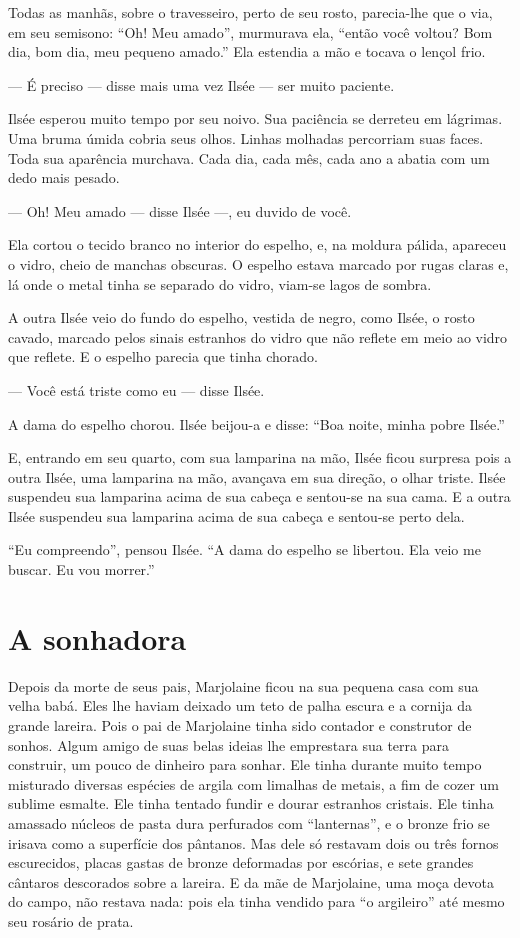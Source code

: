 Todas as manhãs, sobre o travesseiro, perto de seu rosto, parecia-lhe
que o via, em seu semisono: “Oh! Meu amado'', murmurava ela, ``então você
voltou? Bom dia, bom dia, meu pequeno amado.” Ela estendia a mão e tocava
o lençol frio.

--- É preciso --- disse mais uma vez Ilsée --- ser muito paciente.

Ilsée esperou muito tempo por seu noivo. Sua paciência se derreteu em
lágrimas. Uma bruma úmida cobria seus olhos. Linhas molhadas percorriam
suas faces. Toda sua aparência murchava. Cada dia, cada mês, cada ano a
abatia com um dedo mais pesado.

--- Oh! Meu amado --- disse Ilsée ---, eu duvido de você.

Ela cortou o tecido branco no interior do espelho, e, na moldura
pálida, apareceu o vidro, cheio de manchas obscuras. O espelho estava
marcado por rugas claras e, lá onde o metal tinha se separado do vidro,
viam-se lagos de sombra.

A outra Ilsée veio do fundo do espelho, vestida de negro, como Ilsée, o
rosto cavado, marcado pelos sinais estranhos do vidro que não reflete em meio
ao vidro que reflete. E o espelho parecia que tinha chorado.

--- Você está triste como eu --- disse Ilsée.

A dama do espelho chorou. Ilsée beijou-a e disse: “Boa noite, minha pobre
Ilsée.”

E, entrando em seu quarto, com sua lamparina na mão, Ilsée ficou
surpresa pois a outra Ilsée, uma lamparina na mão, avançava em sua
direção, o olhar triste. Ilsée suspendeu sua lamparina acima de sua cabeça
e sentou-se na sua cama. E a outra Ilsée suspendeu sua lamparina acima de
sua cabeça e sentou-se perto dela.

“Eu compreendo”, pensou Ilsée. “A dama do espelho se libertou. Ela veio
me buscar. Eu vou morrer.”

\section*{A sonhadora}

Depois da morte de seus pais, Marjolaine ficou na sua pequena casa com
sua velha babá. Eles lhe haviam deixado um teto de palha escura e a
cornija da grande lareira. Pois o pai de Marjolaine tinha sido contador
e construtor de sonhos. Algum amigo de suas belas ideias lhe emprestara
sua terra para construir, um pouco de dinheiro para sonhar. Ele tinha
durante muito tempo misturado diversas espécies de argila com limalhas de
metais, a fim de cozer um sublime esmalte. Ele tinha tentado fundir e
dourar estranhos cristais. Ele tinha amassado núcleos de pasta dura
perfurados com “lanternas”, e o bronze frio se irisava como a superfície
dos pântanos. Mas dele só restavam dois ou três fornos escurecidos, placas
gastas de bronze deformadas por escórias, e sete grandes cântaros
descorados sobre a lareira. E da mãe de Marjolaine, uma moça devota do
campo, não restava nada: pois ela tinha vendido para “o argileiro” até
mesmo seu rosário de prata.


